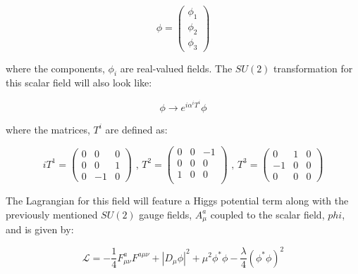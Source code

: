 \begin{equation}\label{eq:non_abelian_higgs_mechanism_phi}
\phi = 
  \begin{pmatrix}
    \phi_{1} \\
    \phi_{2} \\
    \phi_{3}
    \end{pmatrix}
\end{equation}

\noindent where the components, $\phi_{i}$ are real-valued fields.
The $SU(2)$ transformation for this scalar field will also look like:

\begin{equation}\label{eq:non_abelian_higgs_mechanism_transformation}
\phi \rightarrow e^{i\alpha^{i}T^{i}}\phi
\end{equation}

\noindent where the matrices, $T^{i}$ are defined as:

\tiny
\begin{equation}\label{eq:non_abelian_higgs_mechanism_generators}
iT^{1} = 
  \begin{pmatrix}
    0  &  0  &  0 \\
    0  &  0  &  1 \\
    0  & -1 &  0 
  \end{pmatrix}
\text{   ,    }
T^{2} = 
  \begin{pmatrix}
    0  &  0  & -1 \\
    0  &  0  &  0 \\
    1  &  0  &  0 \\ 
  \end{pmatrix}
\text{   ,   }
T^{3} = 
  \begin{pmatrix}
    0  &   1  &  0 \\
   -1 &   0  &  0 \\
    0  &   0  &  0
  \end{pmatrix}
\end{equation}
\normalsize

\noindent The Lagrangian for this field will feature a Higgs potential
term along with the previously mentioned $SU(2)$ gauge fields, $A_{\mu}^{a}$ coupled
to the scalar field, $phi$, and is given by:

\begin{equation}\label{eq:non_abelian_higgs_mechanism_lagrangian}
\mathcal{L} = -\frac{1}{4}F_{\mu\nu}^{a}F^{a\mu\nu}+ |D_{\mu}\phi|^{2}
+ \mu^{2}\phi^{\ast}\phi - \frac{\lambda}{4}(\phi^{\ast}\phi)^{2}
\end{equation}

